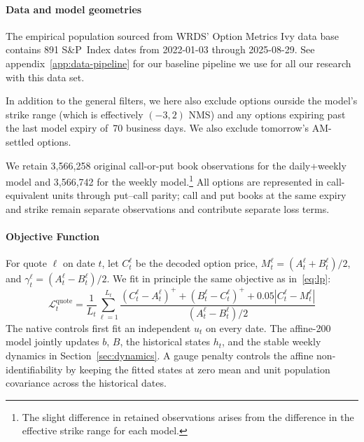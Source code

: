 \documentclass[11pt,a4paper]{article}
\begin{document}
\paragraph{Data and model geometries}

The empirical population sourced from WRDS' Option Metrics Ivy data base contains 891 S\&P~Index dates from 2022-01-03 through
2025-08-29. See appendix~\ref{app:data-pipeline} for our baseline pipeline we use for all our research with this data set.

In addition to the general filters, we here also exclude options ourside the model's strike range (which is effectively $(-3,2)$ NMS) and any options expiring
past the last model expiry of~70 business days. We also exclude tomorrow's AM-settled options. 

We retain 3,566,258 original call-or-put book observations for the daily+weekly model and 3,566,742 for the weekly model.\footnote{
  The slight difference in retained observations arises from the difference in the effective strike range for each model.
}
All options are represented in call-equivalent units through put–call parity; call and put books at the
same expiry and strike remain separate observations and contribute separate loss terms.

\paragraph{Objective Function}

For quote $\ell$ on date $t$, let $ C_t^\ell$ be the decoded option
price, $M_t^\ell=( A_t^\ell+ B_t^\ell)/2$, and
$\gamma_t^\ell=( A_t^\ell- B_t^\ell)/2$. We fit in principle the same
objective as in~\eqref{eq:lp}:
\begin{equation}
  \mathcal L_t^{\mathrm{quote}}
  =
  \frac{1}{L_t}\sum_{\ell=1}^{L_t}
  \frac{(C_t^\ell- A_t^\ell)^+
    +( B_t^\ell-C_t^\ell)^+
    +0.05|C_t^\ell-M_t^\ell|   
  }{ ( A_t^\ell- B_t^\ell)/2 }  
  \label{eq:production-quote-loss} 
\end{equation}
The native controls first fit an independent $u_t$ on every date.  The
affine-200 model jointly updates
$b$, $B$, the historical states $h_t$, and the stable weekly dynamics in
Section~\ref{sec:dynamics}.  A gauge penalty controls the affine
non-identifiability by keeping the fitted states at zero mean and unit
population covariance across the historical dates.
\end{document}
